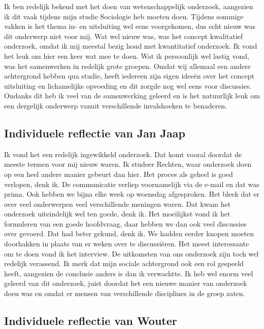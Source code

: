 \documentclass[a4paper,12pt]{memoir}
\begin{document}
Ik ben redelijk bekend met het doen van wetenschappelijk onderzoek, aangezien ik dit vaak tijdens mijn studie Sociologie heb moeten doen. Tijdens sommige vakken is het thema in- en uitsluiting wel eens voorgekomen, dus echt nieuw was dit onderwerp niet voor mij. Wat wel nieuw was, was het concept kwalitatief onderzoek, omdat ik mij meestal bezig houd met kwantitatief onderzoek. Ik vond het leuk om hier een keer wat mee te doen. Wat ik persoonlijk wel lastig vond, was het samenwerken in redelijk grote groepen. Omdat wij allemaal een andere achtergrond hebben qua studie, heeft iedereen zijn eigen ideeën over het concept uitsluiting en lichamelijke opvoeding en dit zorgde nog wel eens voor discussies. Ondanks dit heb ik veel van de samenwerking geleerd en is het natuurlijk leuk om een dergelijk onderwerp vanuit verschillende invalshoeken te benaderen.

\subsection{Individuele reflectie van Jan Jaap}

Ik vond het een redelijk ingewikkeld onderzoek. Dat komt vooral doordat de meeste termen voor mij nieuw waren. Ik studeer Rechten, waar onderzoek doen op een heel andere manier gebeurt dan hier. Het proces als geheel is goed verlopen, denk ik. De communicatie verliep voornamelijk via de e-mail en dat was prima. Ook hebben we bijna elke week op woensdag afgesproken. Het bleek dat er over veel onderwerpen veel verschillende meningen waren. Dat kwam het onderzoek uiteindelijk wel ten goede, denk ik. Het moeilijkst vond ik het formuleren van een goede hoofdvraag, daar hebben we dan ook veel discussies over gevoerd. Dat had beter gekund, denk ik. We hadden eerder knopen moeten doorhakken in plaats van er weken over te discussiëren. Het meest interessante om te doen vond ik het interview. De uitkomsten van ons onderzoek zijn toch wel redelijk verassend. Ik merk dat mijn sociale achtergrond ook een rol gespeeld heeft, aangezien de conclusie anders is dan ik verwachtte. Ik heb wel enorm veel geleerd van dit onderzoek, juist doordat het een nieuwe manier van onderzoek doen was en omdat er mensen van verschillende disciplines in de groep zaten.

\subsection{Individuele reflectie van Wouter}
\end{document}
